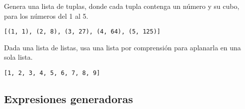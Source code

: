 \begin{exercise} Genera una lista de tuplas, donde cada tupla contenga un número y su cubo, para los números del 1 al 5.
\begin{Shaded}
\begin{Highlighting}[]
\OperatorTok{=}\NormalTok{ [(x, x}\OperatorTok{**}\NormalTok{) } \NormalTok{(}\NormalTok{, }\NormalTok{)]}
\end{Highlighting}
\end{Shaded}

\begin{verbatim}
[(1, 1), (2, 8), (3, 27), (4, 64), (5, 125)]

\end{verbatim}
\end{exercise}

\begin{exercise} Dada una lista de listas, usa una lista por comprensión para aplanarla en una sola lista.
\begin{Shaded}
\begin{Highlighting}[]
\OperatorTok{=}\NormalTok{ [[}\NormalTok{, }\NormalTok{, }\NormalTok{], [}\NormalTok{, }\NormalTok{], [}\NormalTok{, }\NormalTok{, }\NormalTok{, }\NormalTok{]]}
\OperatorTok{=}\NormalTok{ [elemento }\NormalTok{ sublista]}
\end{Highlighting}
\end{Shaded}

\begin{verbatim}
[1, 2, 3, 4, 5, 6, 7, 8, 9]

\end{verbatim}
\end{exercise}

\subsection{Expresiones generadoras}

